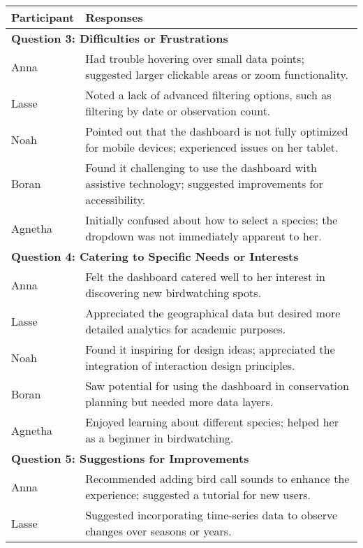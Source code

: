 \begin{table}[H]
    \centering
    \begin{tabular}{p{3cm} | p{12cm}}
        \hline
        \textbf{Participant} & \textbf{Responses} \\
        \hline
        \multicolumn{2}{l}{\textbf{Question 3: Difficulties or Frustrations}} \\
        \hline
        Anna & Had trouble hovering over small data points; suggested larger clickable areas or zoom functionality. \\
        \hline
        Lasse & Noted a lack of advanced filtering options, such as filtering by date or observation count. \\
        \hline
        Noah & Pointed out that the dashboard is not fully optimized for mobile devices; experienced issues on her tablet. \\
        \hline
        Boran & Found it challenging to use the dashboard with assistive technology; suggested improvements for accessibility. \\
        \hline
        Agnetha & Initially confused about how to select a species; the dropdown was not immediately apparent to her. \\
        \hline
        \multicolumn{2}{l}{\textbf{Question 4: Catering to Specific Needs or Interests}} \\
        \hline
        Anna & Felt the dashboard catered well to her interest in discovering new birdwatching spots. \\
        \hline
        Lasse & Appreciated the geographical data but desired more detailed analytics for academic purposes. \\
        \hline
        Noah & Found it inspiring for design ideas; appreciated the integration of interaction design principles. \\
        \hline
        Boran & Saw potential for using the dashboard in conservation planning but needed more data layers. \\
        \hline
        Agnetha & Enjoyed learning about different species; helped her as a beginner in birdwatching. \\
        \hline
        \multicolumn{2}{l}{\textbf{Question 5: Suggestions for Improvements}} \\
        \hline
        Anna & Recommended adding bird call sounds to enhance the experience; suggested a tutorial for new users. \\
        \hline
        Lasse & Suggested incorporating time-series data to observe changes over seasons or years. \\

\end{tabular}
\end{table}
